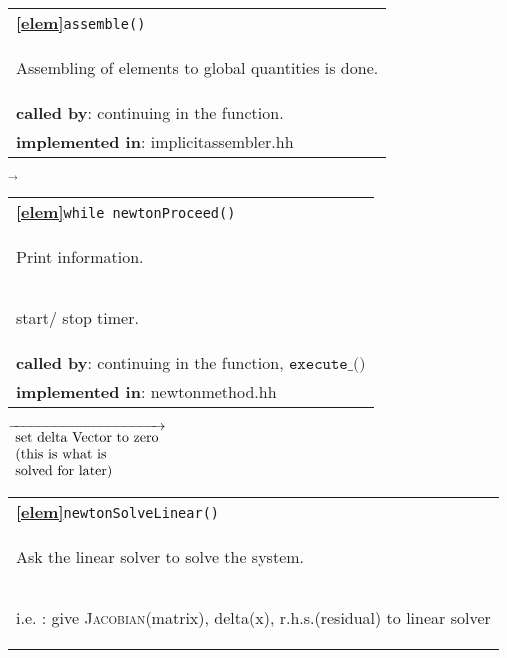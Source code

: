 \begin{landscape}
{\begin{tabular}{|l|}
      \hline 
      \textbf{\textcircled{\ref{elem}}}\verb?assemble()? \\ 
      \begin{scriptsize}Assembling of elements to global quantities is done.\end{scriptsize}\\
      \textbf{called by}: continuing in the function. \\ 
      \textbf{implemented in}: implicitassembler.hh\\ 
	\hline 
  \end{tabular}
\nextline
    {$\overrightarrow{}
    $}
   \begin{tabular}{|l|} 
      \hline 
      \textbf{\textcircled{\ref{elem}}}\verb?while newtonProceed()  ?\\ 
      \begin{scriptsize}Print information.\end{scriptsize}\\
      \begin{scriptsize}start/ stop timer.\end{scriptsize}\\
      \textbf{called by}: continuing in the function, $\texttt{execute\_()}$ \\ 
      \textbf{implemented in}: newtonmethod.hh\\ 
	\hline 
  \end{tabular}
    {\scriptsize$\overrightarrow
				  {\begin{array}{l}
				  \textnormal{set delta Vector to zero} \\
				  \textnormal{(this is what is}\\
				  \textnormal{solved for later)}\\
                                \end{array}}
    $}
   \begin{tabular}{|l|} 
      \hline 
      \textbf{\textcircled{\ref{elem}}}\verb?newtonSolveLinear()  ?\\ 
      \begin{scriptsize}Ask the linear solver to solve the system.\end{scriptsize}\\
      \begin{scriptsize}i.e. : give \textsc{Jacobian}(matrix), delta(x), r.h.s.(residual) to linear solver\end{scriptsize}\\

\end{tabular}}
\end{landscape}
